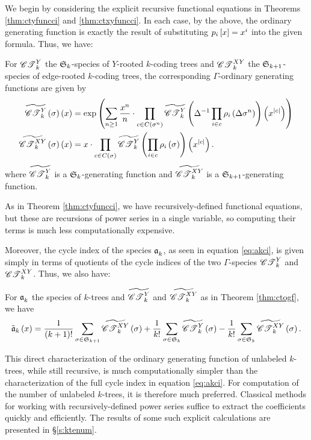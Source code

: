 \documentclass[distribution,draft]{brandiss} %
\numberwithin{section}{chapter}
\numberwithin{figure}{chapter}
\begin{document}
We begin by considering the explicit recursive functional equations in Theorems \ref{thm:ctyfuncci} and \ref{thm:ctxyfuncci}.
In each case, by the above, the ordinary generating function is exactly the result of substituting $p_{i} \left[ {x} \right] = x^{i}$ into the given formula.
Thus, we have:
\begin{theorem}
  \label{thm:ctogf}
  For $\mathscr{CT}_{k}^{Y}$ the $ \mathfrak{S}_{k} $-species of $Y$-rooted $k$-coding trees and $\mathscr{CT}_{k}^{XY}$ the $ \mathfrak{S}_{k+1} $-species of edge-rooted $k$-coding trees, the corresponding $\Gamma$-ordinary generating functions are given by
  \begin{align}
    \widetilde{\mathscr{CT}_{k}^{Y}} \left( {\sigma} \right) \left( {x} \right) &= \exp \left( { \sum_{n \geq 1} \frac{x^{n}}{n} \cdot \prod_{c \in C \left( {\sigma^{n}} \right)} \widetilde{\mathscr{CT}_{k}^{Y}} \left( {\Delta^{-1} \prod_{i \in c} \rho_{i} \left( {\Delta \sigma^{n}} \right)} \right) \left( {x^{\left\vert {c} \right\vert}} \right)} \right) \label{eq:ctyogf} \\
    \widetilde{\mathscr{CT}_{k}^{XY}} \left( {\sigma} \right) \left( {x} \right) &= x \cdot \prod_{c \in C \left( {\sigma} \right)} \widetilde{\mathscr{CT}_{k}^{Y}} \left( {\prod_{i \in c} \rho_{i} \left( {\sigma} \right)} \right) \left( {x^{\left\vert {c} \right\vert}} \right). \label{eq:ctxyogf}
  \end{align}
  where $\widetilde{\mathscr{CT}_{k}^{Y}}$ is a $ \mathfrak{S}_{k} $-generating function and $\widetilde{\mathscr{CT}_{k}^{XY}}$ is a $ \mathfrak{S}_{k+1} $-generating function.
\end{theorem}
As in Theorem \ref{thm:ctyfuncci}, we have recursively-defined functional equations, but these are recursions of power series in a single variable, so computing their terms is much less computationally expensive.

Moreover, the cycle index of the species $\mathfrak{a}_{k}^{}$, as seen in equation \eqref{eq:akci}, is given simply in terms of quotients of the cycle indices of the two $\Gamma$-species $\mathscr{CT}_{k}^{Y}$ and $\mathscr{CT}_{k}^{XY}$.
Thus, we also have:
\begin{theorem}
  \label{thm:akogf}
  For $\mathfrak{a}_{k}^{}$ the species of $k$-trees and $\widetilde{\mathscr{CT}_{k}^{Y}}$ and $\widetilde{\mathscr{CT}_{k}^{XY}}$ as in Theorem \ref{thm:ctogf}, we have
  \begin{equation}
    \label{eq:akogf}
    \tilde{\mathfrak{a}}_{k} \left( {x} \right) = \frac{1}{\left( {k+1} \right)!} \sum_{\sigma \in  \mathfrak{S}_{k+1} } \widetilde{\mathscr{CT}_{k}^{XY}} \left( {\sigma} \right) + \frac{1}{k!} \sum_{\sigma \in  \mathfrak{S}_{k} } \widetilde{\mathscr{CT}_{k}^{Y}} \left( {\sigma} \right) - \frac{1}{k!} \sum_{\sigma \in  \mathfrak{S}_{k} } \widetilde{\mathscr{CT}_{k}^{XY}} \left( {\sigma} \right).
  \end{equation}
\end{theorem}

This direct characterization of the ordinary generating function of unlabeled $k$-trees, while still recursive, is much computationally simpler than the characterization of the full cycle index in equation \eqref{eq:akci}.
For computation of the number of unlabeled $k$-trees, it is therefore much preferred.
Classical methods for working with recursively-defined power series suffice to extract the coefficients quickly and efficiently.
The results of some such explicit calculations are presented in \S \ref{s:ktenum}.
\end{document}
